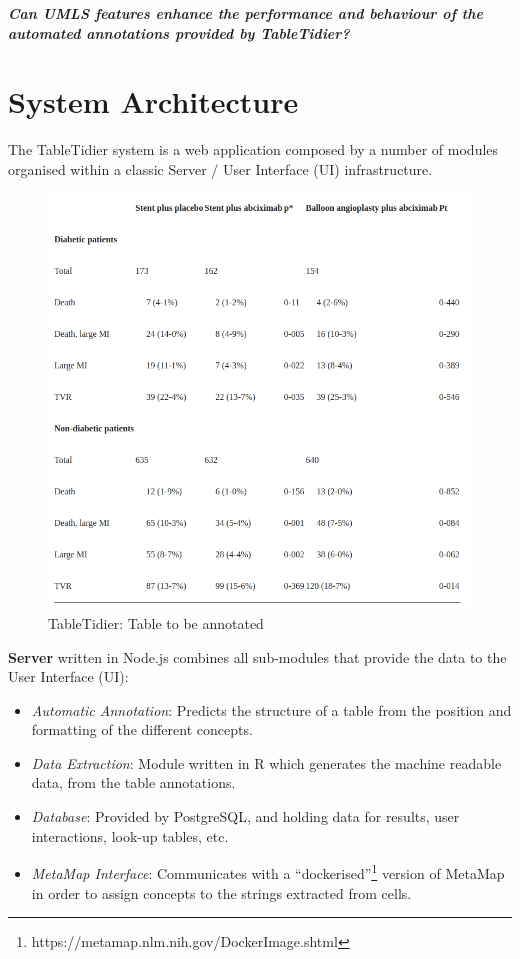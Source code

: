 \documentclass[10.7pt,]{article}
\begin{document}
\begin{center}
\textit{\textbf{Can UMLS features enhance the performance and behaviour of the automated annotations provided by TableTidier?}}
\end{center}


\section{System Architecture}\label{system-architecture}

The TableTidier system is a web application composed by a number of modules organised within a classic Server / User Interface (UI) infrastructure.

\begin{figure}
	\centering
	\includegraphics[width=0.7\linewidth]{../resources/screenshot003}
	\caption{TableTidier: Table to be annotated}
	\label{fig:annotator}
\end{figure}

%



\textbf{Server} written in Node.js combines all sub-modules that provide the data to the User Interface (UI):
	\begin{itemize}
		\item \textit{Automatic Annotation}: Predicts the structure of a table from the position and formatting of the different concepts.
		\item \textit{Data Extraction}: Module written in R which generates the machine readable data, from the table annotations.
		\item \textit{Database}: Provided by PostgreSQL, and holding data for results, user interactions, look-up tables, etc.
		\item \textit{MetaMap Interface}: Communicates with a ``dockerised''\footnote{https://metamap.nlm.nih.gov/DockerImage.shtml} version of MetaMap in order to assign concepts to the strings extracted from cells.
	\end{itemize}
	
\end{document}

